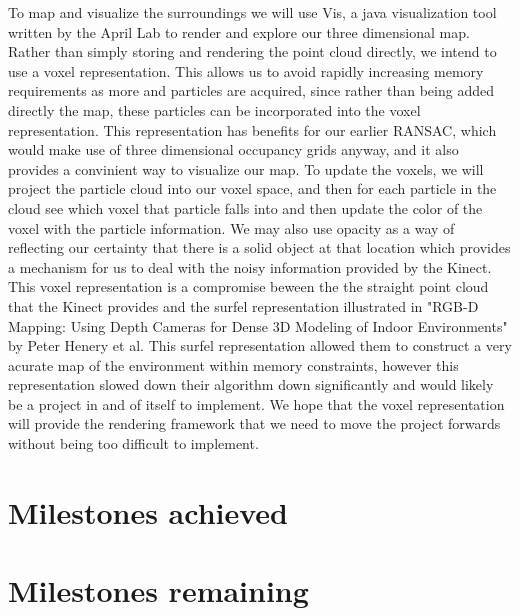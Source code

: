 \documentclass[12pt]{article}
\begin{document}
	To map and visualize the surroundings we will use Vis, a java visualization tool written by the April Lab to render and explore our three dimensional map.   Rather than simply storing and rendering the point cloud directly, we intend to use a voxel representation.  This allows us to avoid rapidly increasing memory requirements as more and particles are acquired, since rather than being added directly the map, these particles can be incorporated into the voxel representation.  This representation has benefits for our earlier RANSAC, which would make use of three dimensional occupancy grids anyway, and it also provides a convinient way to visualize our map.  To update the voxels, we will project the particle cloud into our voxel space, and then for each particle in the cloud see which voxel that particle falls into and then update the color of the voxel with the particle information.  We may also use opacity as a way of reflecting our certainty that there is a solid object at that location which provides a mechanism for us to deal with the noisy information provided by the Kinect.  This voxel representation is a compromise beween the the straight point cloud that the Kinect provides and the surfel representation illustrated in "RGB-D Mapping: Using Depth Cameras for Dense 3D Modeling of Indoor Environments" by Peter Henery et al. This surfel representation allowed them to construct a very acurate map of the environment within memory constraints, however this representation slowed down their algorithm down significantly and would likely be a project in and of itself to implement.  We hope that the voxel representation will provide the rendering framework that we need to move the project forwards without being too difficult to implement. 


\section{Milestones achieved}

\section{Milestones remaining}
\end{document}

